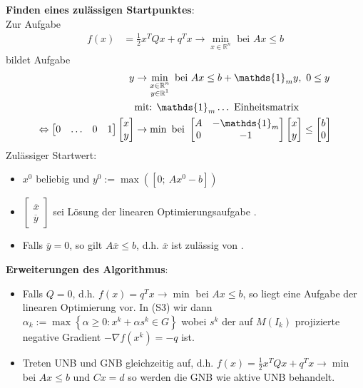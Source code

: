 \textbf{Finden eines zulässigen Startpunktes}:\\
Zur Aufgabe 
\begin{align}
	f(x) & =\frac12 x^TQx+q^Tx\rightarrow\min\limits_{x\in\mathbb{R}^n} \text{ bei } Ax\le b \label{eq:startpkt_1}
\end{align} 
bildet Aufgabe 
\begin{align}
	y & \rightarrow\min\limits_{\substack{x\in\mathbb{R}^n\\y\in\mathbb{R}^1}} \text{ bei } Ax\le b+\mathds{1}_m y,\ 0\le y \label{eq:startpkt_2}\\
	& \text{mit: } \mathds{1}_m\ldots \text{ Einheitsmatrix} \notag\\
	\Leftrightarrow \begin{bmatrix} 0 & \ldots & 0 & 1 \end{bmatrix}\begin{bmatrix} x\\y \end{bmatrix} & \rightarrow\min  \text{ bei } \begin{bmatrix} A & -\mathds{1}_m\\0 & -1
	\end{bmatrix}\begin{bmatrix} x\\y \end{bmatrix}\le \begin{bmatrix} b\\0 \end{bmatrix} \label{eq:startpkt_3}
\end{align}
Zulässiger Startwert:
\begin{itemize}
  \item[] $x^0$ beliebig und $y^0:=\max\left([0;\ Ax^0-b]\right)$
  \item[] $\begin{bmatrix}\overline{x}\\ \overline{y} \end{bmatrix}$ sei Lösung der linearen Optimierungsaufgabe .
  \item[] Falls $\overline{y}=0$, so gilt 
  $A\overline{x}\le b$, d.h. $\overline{x}$ ist zulässig von .
\end{itemize}

\textbf{Erweiterungen des Algorithmus}:
\begin{itemize}
  \item Falls $Q=0$, d.h. $f(x)=q^Tx\rightarrow\min$ bei $Ax\le b$, so liegt eine Aufgabe der linearen Optimierung vor. In (S3) wir dann $\alpha_k:=\max\left\{ \alpha\ge 0: x^k+\alpha
  s^k\in G \right\}$ wobei $s^k$ der auf $M(I_k)$ projizierte negative Gradient $-\nabla f(x^k)=-q$ ist.
  \item Treten UNB und GNB gleichzeitig auf, d.h. $f(x)=\frac12 x^TQx+q^Tx\rightarrow\min$ bei $Ax\le b$ und $Cx=d$ so werden die GNB wie aktive UNB behandelt.
 \end{itemize}

